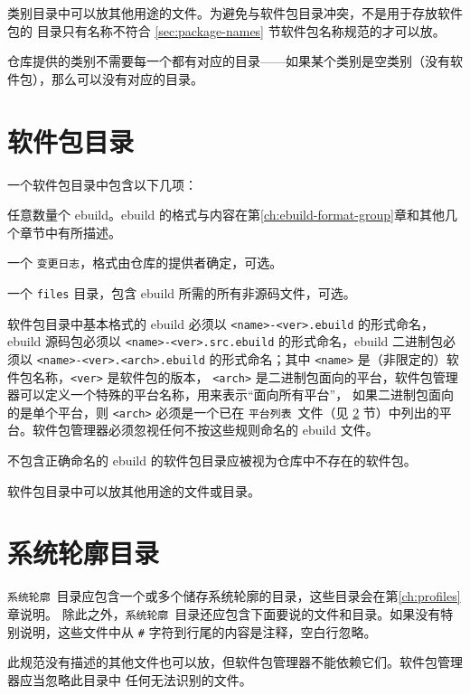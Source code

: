 类别目录中可以放其他用途的文件。为避免与软件包目录冲突，不是用于存放软件包的
目录只有名称不符合 \ref{sec:package-names} 节软件包名称规范的才可以放。

仓库提供的类别不需要每一个都有对应的目录——如果某个类别是空类别（没有软件包），那么可以没有对应的目录。

\section{软件包目录}
\label{sec:package-dirs}

一个软件包目录中包含以下几项：
\begin{compactitem}
\item 任意数量个 ebuild。ebuild 的格式与内容在第\ref{ch:ebuild-format-group}章和其他几个章节中有所描述。
\item 一个 \texttt{变更日志}，格式由仓库的提供者确定，可选。
\item 一个 \texttt{files} 目录，包含 ebuild 所需的所有非源码文件，可选。
\end{compactitem}

软件包目录中基本格式的 ebuild 必须以 \texttt{<name>-<ver>.ebuild} 的形式命名，ebuild 源码包必须以
\texttt{<name>-<ver>.src.ebuild} 的形式命名，ebuild 二进制包必须以 \texttt{<name>-<ver>.<arch>.ebuild}
的形式命名；其中 \texttt{<name>} 是（非限定的）软件包名称，\texttt{<ver>} 是软件包的版本，
\texttt{<arch>} 是二进制包面向的平台，软件包管理器可以定义一个特殊的平台名称，用来表示“面向所有平台”，
如果二进制包面向的是单个平台，则 \texttt{<arch>} 必须是一个已在 \texttt{平台列表}\ 文件（见
\ref{sec:profiles-dir} 节）中列出的平台。软件包管理器必须忽视任何不按这些规则命名的 ebuild 文件。

不包含正确命名的 ebuild 的软件包目录应被视为仓库中不存在的软件包。

软件包目录中可以放其他用途的文件或目录。

\section{系统轮廓目录}
\label{sec:profiles-dir}

\texttt{系统轮廓}\ 目录应包含一个或多个储存系统轮廓的目录，这些目录会在第\ref{ch:profiles}章说明。
除此之外，\texttt{系统轮廓}\ 目录还应包含下面要说的文件和目录。如果没有特别说明，这些文件中从
\texttt{\#} 字符到行尾的内容是注释，空白行忽略。

此规范没有描述的其他文件也可以放，但软件包管理器不能依赖它们。软件包管理器应当忽略此目录中
任何无法识别的文件。

